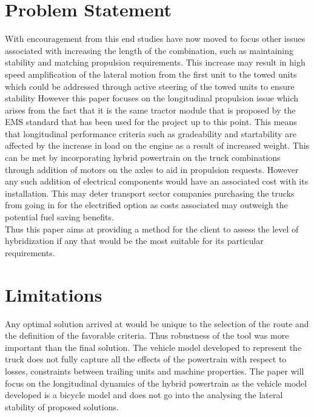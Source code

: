 \documentclass[MastersThesis.tex]{subfiles}
\begin{document}
\section{Problem Statement} \label{sec:introproblemstatement}
	With encouragement from this end studies have now moved to focus other issues associated with increasing the length of the combination, such as maintaining stability and matching propulsion requirements. This increase may result in high speed amplification of the lateral motion from the first unit to the towed units which could be addressed through active steering of the towed units to ensure stability \cite{Kharrazi10} However this paper focuses on the longitudinal propulsion issue which arises from the fact that it is the same tractor module that is proposed by the EMS standard that has been used for the project up to this point. This means that longitudinal performance criteria such as gradeability and startability are affected by the increase in load on the engine as a result of increased weight. 
	This can be met by incorporating hybrid powertrain on the truck combinations through addition of motors on the axles to aid in propulsion requests. However any such addition of electrical components would have an associated cost with its installation. This may deter transport sector companies purchasing the trucks from going in for the electrified option as costs associated may outweigh the potential fuel saving benefits.\\

	Thus this paper aims at providing a method for the client to assess the level of hybridization if any that would be the most suitable for its particular requirements.

\section{Limitations}\label{sec:introlimitation}
	Any optimal solution arrived at would be unique to the selection of the route and the definition of the favorable criteria. Thus  robustness of the tool was more important than the final solution. The vehicle model developed to represent the truck does not fully capture all the effects of the powertrain with respect to losses, constraints between trailing units and machine properties. The paper will focus on the longitudinal dynamics of the hybrid powertrain as the vehicle model developed is a bicycle model and does not go into the analysing the lateral stability of proposed solutions. 
\end{document}
